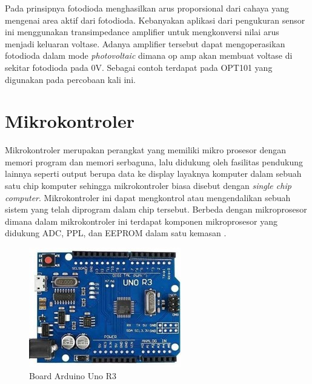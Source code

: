 Pada prinsipnya fotodioda menghasilkan arus proporsional dari cahaya yang mengenai area aktif dari
fotodioda. Kebanyakan aplikasi dari pengukuran sensor ini menggunakan transimpedance amplifier
untuk mengkonversi nilai arus menjadi keluaran voltase. Adanya amplifier tersebut dapat
mengoperasikan fotodioda dalam mode \textit{photovoltaic} dimana op amp akan membuat voltase di
sekitar fotodioda pada 0V. Sebagai contoh terdapat pada OPT101 yang digunakan pada percobaan kali
ini.




\section{Mikrokontroler}
Mikrokontroler merupakan perangkat yang memiliki mikro prosesor dengan memori program dan memori
serbaguna, lalu didukung oleh fasilitas pendukung lainnya seperti output berupa data ke display
layaknya komputer dalam sebuah satu chip komputer sehingga mikrokontroler biasa disebut dengan
\textit{single chip computer}. Mikrokontroler ini dapat mengkontrol atau mengendalikan sebuah sistem
yang telah diprogram dalam chip tersebut. Berbeda dengan mikroprosesor dimana dalam mikrokontroler
ini terdapat komponen mikroprosesor yang didukung ADC, PPL, dan EEPROM dalam satu kemasan
\cite{Sokop2016}.

\begin{figure}[H]
    \centering
    \includegraphics{Images/ArduinoUno.jpg}
    \caption{Board Arduino Uno R3}
    \label{fig:arduino}
\end{figure}


